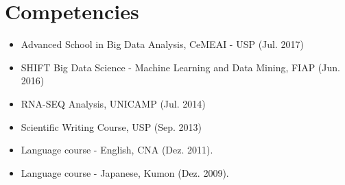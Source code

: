 \documentclass[letterpaper]{twentysecondcv} %
\begin{document}
\section{Competencies}
\begin{itemize}
	\item Advanced School in Big Data Analysis, CeMEAI - USP (Jul. 2017)
	\item SHIFT Big Data Science - Machine Learning and Data Mining, FIAP (Jun. 2016)
	\item RNA-SEQ Analysis, UNICAMP (Jul. 2014)
	\item Scientific Writing Course, USP (Sep. 2013)
	\item Language course - English, CNA (Dez. 2011).
	\item Language course - Japanese, Kumon (Dez. 2009).
\end{itemize}
\end{document}
